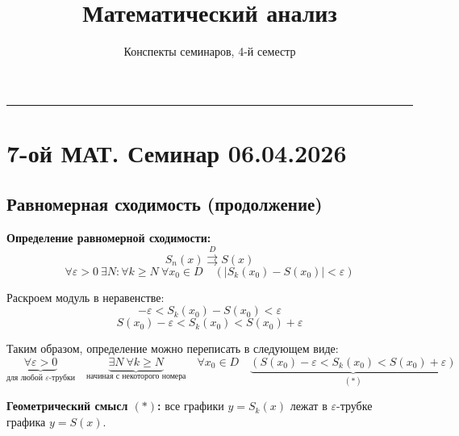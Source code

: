 \documentclass[
  12pt,
  oneside,
  openany]{book}
\title{Математический анализ}
\subtitle{Конспекты семинаров, 4-й семестр}
\author{}
\date{}
\begin{document}
\frontmatter
\maketitle

\renewcommand*\contentsname{Содержание}
{
\setcounter{tocdepth}{3}
\tableofcontents
\vspace{-1.25\baselineskip}
}
\makeatletter
\renewcommand{\mainmatter}{%
  \@mainmattertrue
  }%
\makeatother
\mainmatter
\begin{center}\rule{0.5\linewidth}{0.5pt}\end{center}

\chapter{7-ой МАТ. Семинар
06.04.2026}\label{ux43eux439-ux43cux430ux442.-ux441ux435ux43cux438ux43dux430ux440-06.04.2026}

\section{Равномерная сходимость
(продолжение)}\label{ux440ux430ux432ux43dux43eux43cux435ux440ux43dux430ux44f-ux441ux445ux43eux434ux438ux43cux43eux441ux442ux44c-ux43fux440ux43eux434ux43eux43bux436ux435ux43dux438ux435}

\textbf{Определение равномерной сходимости:}
\[S_n(x) \overset{D}{\rightrightarrows} S(x)\]
\[\forall \varepsilon > 0 \ \exists N : \forall k \ge N \ \forall x_0 \in D \quad (|S_k(x_0) - S(x_0)| < \varepsilon)\]

Раскроем модуль в неравенстве:
\[-\varepsilon < S_k(x_0) - S(x_0) < \varepsilon\]
\[S(x_0) - \varepsilon < S_k(x_0) < S(x_0) + \varepsilon\]

Таким образом, определение можно переписать в следующем виде:
\[\underbrace{\forall \varepsilon > 0}_{\text{для любой $\varepsilon$-трубки}} \quad \underbrace{\exists N \ \forall k \ge N}_{\text{начиная с некоторого номера}} \quad \forall x_0 \in D \quad \underbrace{\left( S(x_0) - \varepsilon < S_k(x_0) < S(x_0) + \varepsilon \right)}_{(\ast)}\]

\textbf{Геометрический смысл \((\ast)\):} все графики \(y = S_k(x)\)
лежат в \(\varepsilon\)-трубке графика \(y = S(x)\).
\end{document}

